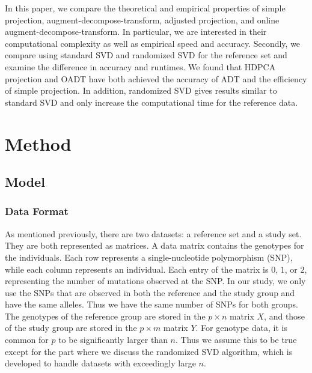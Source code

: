 \documentclass{article}
\begin{document}
In this paper, we compare the theoretical and empirical properties of simple
projection, augment-decompose-transform, adjusted projection, and online augment-decompose-transform. In particular, we are
interested in their computational complexity as well as empirical speed and
accuracy.
Secondly, we compare using standard SVD and randomized SVD for the reference set
and examine the difference in accuracy and runtimes.
We found that HDPCA projection and OADT have both achieved the accuracy of ADT
and the efficiency of simple projection.
In addition, randomized SVD gives results similar to standard SVD and only
increase the computational time for the reference data.





\section{Method}

\subsection{Model}

\subsubsection{Data Format}
As mentioned previously, there are two datasets: a reference set and a study
set.
They are both represented as matrices.
A data matrix contains the genotypes for the individuals.
Each row represents a single-nucleotide polymorphism (SNP),
while each column represents an individual.
Each entry of the matrix is $0$, $1$, or $2$,
representing the number of mutations observed at the SNP.
In our study, we only use the SNPs that are observed in both the reference and
the study group and have the same alleles.
Thus we have the same number of SNPs for both groups.
The genotypes of the reference group are stored in the $p \times n$ matrix $X$,
and those of the study group are stored in the $p \times m$ matrix $Y$.
For genotype data, it is common for $p$ to be significantly larger than $n$.
Thus we assume this to be true except for the part where we discuss the randomized SVD algorithm,
which is developed to handle datasets with exceedingly large $n$.
\end{document}
